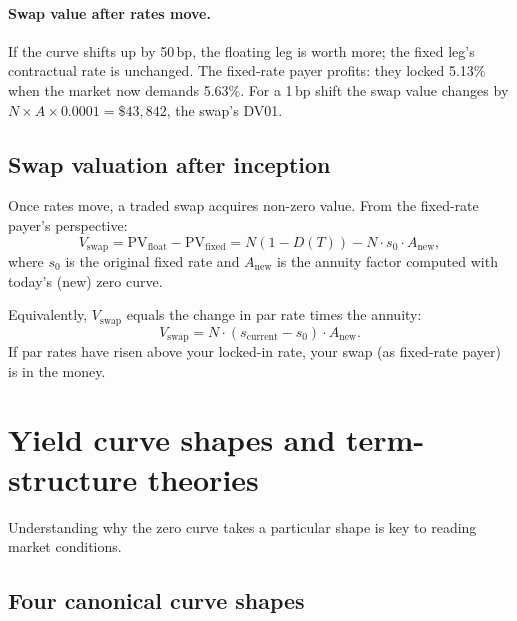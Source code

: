 \paragraph{Swap value after rates move.}
If the curve shifts up by 50\,bp, the floating leg is worth more; the
fixed leg's contractual rate is unchanged.  The fixed-rate payer
profits: they locked 5.13\% when the market now demands 5.63\%.
For a 1\,bp shift the swap value changes by
$N \times A \times 0.0001 = \$43{,}842$, the swap's DV01.

\subsection{Swap valuation after inception}

Once rates move, a traded swap acquires non-zero value.  From the
fixed-rate payer's perspective:
\begin{equation}
  V_{\text{swap}} = \text{PV}_{\text{float}} -
    \text{PV}_{\text{fixed}}
  = N(1 - D(T)) - N \cdot s_0 \cdot A_{\text{new}},
  \label{eq:swap_mtm}
\end{equation}
where $s_0$ is the original fixed rate and $A_{\text{new}}$ is the
annuity factor computed with today's (new) zero curve.

Equivalently, $V_{\text{swap}}$ equals the change in par rate times
the annuity:
\begin{equation}
  V_{\text{swap}} = N \cdot (s_{\text{current}} - s_0) \cdot
    A_{\text{new}}.
  \label{eq:swap_mtm_par}
\end{equation}
If par rates have risen above your locked-in rate, your swap (as
fixed-rate payer) is in the money.


\section{Yield curve shapes and term-structure theories}
\label{sec:fi_term_structure}

Understanding why the zero curve takes a particular shape is key to
reading market conditions.

\subsection{Four canonical curve shapes}

